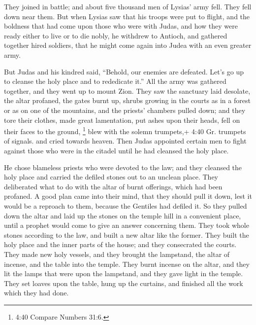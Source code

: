 They joined in battle; and about five thousand men of
Lysias' army fell. They fell down near them.  But when
Lysias saw that his troops were put to flight, and the boldness that had
come upon those who were with Judas, and how they were ready either to
live or to die nobly, he withdrew to Antioch, and gathered together
hired soldiers, that he might come again into Judea with an even greater
army.

 But Judas and his kindred said, ``Behold, our enemies are
defeated. Let's go up to cleanse the holy place and to rededicate it.''
 All the army was gathered together, and they went up to
mount Zion.  They saw the sanctuary laid desolate, the
altar profaned, the gates burnt up, shrubs growing in the courts as in a
forest or as on one of the mountains, and the priests' chambers pulled
down;  and they tore their clothes, made great lamentation,
put ashes upon their heads,  fell on their faces to the
ground, \footnote{4:40 Compare Numbers 31:6.} blew with the solemn
trumpets,+ 4:40 Gr. trumpets of signals. and cried towards heaven.
 Then Judas appointed certain men to fight against those
who were in the citadel until he had cleansed the holy place.

 He chose blameless priests who were devoted to the law;
 and they cleansed the holy place and carried the defiled
stones out to an unclean place.  They deliberated what to
do with the altar of burnt offerings, which had been profaned.
 A good plan came into their mind, that they should pull it
down, lest it would be a reproach to them, because the Gentiles had
defiled it. So they pulled down the altar  and laid up the
stones on the temple hill in a convenient place, until a prophet would
come to give an answer concerning them.  They took whole
stones according to the law, and built a new altar like the former.
 They built the holy place and the inner parts of the
house; and they consecrated the courts.  They made new holy
vessels, and they brought the lampstand, the altar of incense, and the
table into the temple.  They burnt incense on the altar,
and they lit the lamps that were upon the lampstand, and they gave light
in the temple.  They set loaves upon the table, hung up the
curtains, and finished all the work which they had done.

